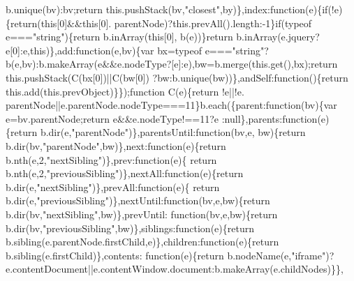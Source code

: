 \begin{DoxyCode}
      b.unique(bv):bv;\textcolor{keywordflow}{return} this.pushStack(bv,\textcolor{stringliteral}{"closest"},by)\},index:\textcolor{keyword}{function}(e)\{\textcolor{keywordflow}{if}(!e)\{\textcolor{keywordflow}{return}(\textcolor{keyword}{this}[0]&&\textcolor{keyword}{this}[0].
      parentNode)?this.prevAll().length:-1\}\textcolor{keywordflow}{if}(typeof e===\textcolor{stringliteral}{"string"})\{\textcolor{keywordflow}{return} b.inArray(\textcolor{keyword}{this}[0],
      b(e))\}\textcolor{keywordflow}{return} b.inArray(e.jquery?e[0]:e,\textcolor{keyword}{this})\},add:\textcolor{keyword}{function}(e,bv)\{var bx=typeof e===\textcolor{stringliteral}{"string"}?
      b(e,bv):b.makeArray(e&&e.nodeType?[e]:e),bw=b.merge(this.get(),bx);\textcolor{keywordflow}{return} this.pushStack(C(bx[0])||C(bw[0])
      ?bw:b.unique(bw))\},andSelf:\textcolor{keyword}{function}()\{\textcolor{keywordflow}{return} this.add(this.prevObject)\}\});\textcolor{keyword}{function} C(e)\{\textcolor{keywordflow}{return} !e||!e.
      parentNode||e.parentNode.nodeType===11\}b.each(\{parent:\textcolor{keyword}{function}(bv)\{var e=bv.parentNode;\textcolor{keywordflow}{return} e&&e.nodeType!==11?e
      :null\},parents:\textcolor{keyword}{function}(e)\{\textcolor{keywordflow}{return} b.dir(e,\textcolor{stringliteral}{"parentNode"})\},parentsUntil:\textcolor{keyword}{function}(bv,e,
      bw)\{\textcolor{keywordflow}{return} b.dir(bv,\textcolor{stringliteral}{"parentNode"},bw)\},next:\textcolor{keyword}{function}(e)\{\textcolor{keywordflow}{return} b.nth(e,2,\textcolor{stringliteral}{"nextSibling"})\},prev:\textcolor{keyword}{function}(e)\{\textcolor{keywordflow}{
      return} b.nth(e,2,\textcolor{stringliteral}{"previousSibling"})\},nextAll:\textcolor{keyword}{function}(e)\{\textcolor{keywordflow}{return} b.dir(e,\textcolor{stringliteral}{"nextSibling"})\},prevAll:\textcolor{keyword}{function}(e)\{\textcolor{keywordflow}{
      return} b.dir(e,\textcolor{stringliteral}{"previousSibling"})\},nextUntil:\textcolor{keyword}{function}(bv,e,bw)\{\textcolor{keywordflow}{return} b.dir(bv,\textcolor{stringliteral}{"nextSibling"},bw)\},prevUntil:\textcolor{keyword}{
      function}(bv,e,bw)\{\textcolor{keywordflow}{return} b.dir(bv,\textcolor{stringliteral}{"previousSibling"},bw)\},siblings:\textcolor{keyword}{function}(e)\{\textcolor{keywordflow}{return} 
      b.sibling(e.parentNode.firstChild,e)\},children:\textcolor{keyword}{function}(e)\{\textcolor{keywordflow}{return} b.sibling(e.firstChild)\},contents:\textcolor{keyword}{
      function}(e)\{\textcolor{keywordflow}{return} b.nodeName(e,\textcolor{stringliteral}{"iframe"})?e.contentDocument||e.contentWindow.document:b.makeArray(e.childNodes)\}\},\textcolor{keyword}{
}
\end{DoxyCode}

